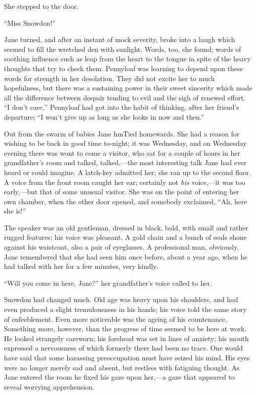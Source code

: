 She stepped to the door.

``Miss Snowdon!''

Jane turned, and after an instant of mock severity, broke into a laugh
which seemed to fill the wretched den with sunlight. Words, too, she
found; words of soothing influence such as leap from the heart to the
tongue in spite of the heavy thoughts that try to check them. Pennyloaf
was learning to depend upon these words for strength in her desolation.
They did not excite her to much hopefulness, but there was a sustaining
power in their sweet sincerity which made all the difference between
despair tending to evil and the sigh of renewed effort. ``I don't
care,'' Pennyloaf had got into the habit of thinking, {}after her
friend's departure; ``I won't give up as long as she looks in now and
then.''

Out from the swarm of babies Jane hmTied homewards. She had a reason for
wishing to be back in good time to-night; it was Wednesday, and on
Wednesday evening there was wont to come a visitor, who sat for a couple
of hours in her grandfather's room and talked, talked,---the most
interesting talk Jane had ever heard or could imagine. A latch-key
admitted her; she ran up to the second floor. A voice from the front
room caught her ear; certainly not \emph{his} voice,---it was too
early,---but that of some unusual visitor. She was on the point of
entering her own chamber, when the other door opened, and somebody
exclaimed, ``Ah, here she is!''

The speaker was an old gentleman, dressed in black, bald, with small and
rather rugged features; his voice was pleasant. A gold chain and a bunch
of seals shone against his waistcoat, also a pair of eyeglasses. A
professional man, obviously. Jane remembered {}that she had seen him
once before, about a year ago, when he had talked with her for a few
minutes, very kindly.

``Will you come in here, Jane?'' her grandfather's voice called to her.

Snowdon had changed much. Old age was heavy upon his shoulders, and had
even produced a slight tremulousness in his hands; his voice told the
same story of enfeeblement. Even more noticeable was the ageing of his
countenance. Something more, however, than the progress of time seemed
to be here at work. He looked strangely careworn; his forehead was set
in lines of anxiety; his mouth expressed a nervousness of which formerly
there had been no trace. One would have said that some harassing
preoccupation must have seized his mind. His eyes were no longer merely
sad and absent, but restless with fatiguing thought. As Jane entered the
room he fixed his gaze upon her,---a gaze that appeared to reveal
worrying apprehension.

